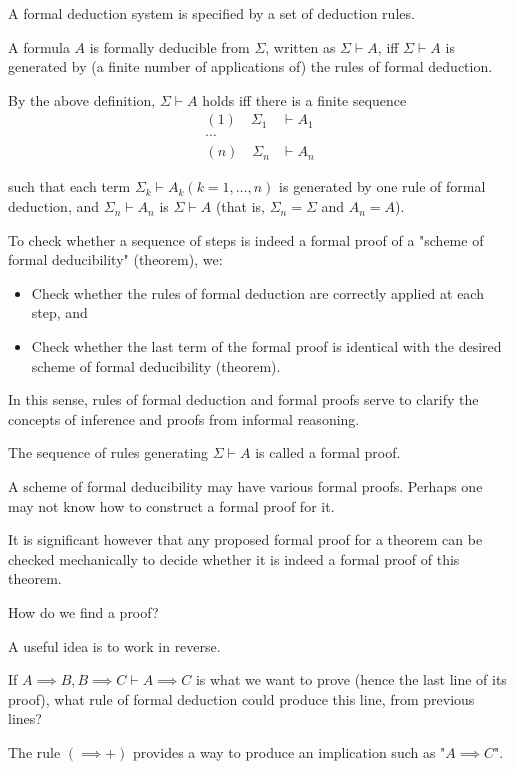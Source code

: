 \documentclass{article}
\begin{document}
A formal deduction system is specified by a set of deduction rules. 

A formula $A$ is formally deducible from $\Sigma$, written as $\Sigma \vdash A$, iff $\Sigma \vdash A$ is generated by (a finite number of applications of) the rules of formal deduction.

By the above definition, $\Sigma \vdash A$ holds iff there is a finite sequence
\begin{align*}
(1) \quad \Sigma_1 &\vdash A_1 \\
\cdots \\
(n) \quad \Sigma_n &\vdash A_n
\end{align*}

such that each term $\Sigma_k \vdash A_k (k = 1, \ldots, n)$ is generated by one rule of formal deduction, and $\Sigma_n \vdash A_n$ is $\Sigma \vdash A$ (that is, $\Sigma_n = \Sigma$ and $A_n = A$).

To check whether a sequence of steps is indeed a formal proof of a "scheme of formal deducibility" (theorem), we:
\begin{itemize}
    \item Check whether the rules of formal deduction are correctly applied at each step, and
    \item Check whether the last term of the formal proof is identical with the desired scheme of formal deducibility (theorem).
\end{itemize}

In this sense, rules of formal deduction and formal proofs serve to clarify the concepts of inference and proofs from informal reasoning. 

The sequence of rules generating $\Sigma \vdash A$ is called a formal proof. 

A scheme of formal deducibility may have various formal proofs. Perhaps one may not know how to construct a formal proof for it. 

It is significant however that any proposed formal proof for a theorem can be checked mechanically to decide whether it is indeed a formal proof of this theorem.

How do we find a proof?

A useful idea is to work in reverse. 

If $A \implies B, B \implies C \vdash A \implies C$ is what we want to prove (hence the last line of its proof), what rule of formal deduction could produce this line, from previous lines? 

The rule $(\implies +)$ provides a way to produce an implication such as "$A \implies C$".
\end{document}
